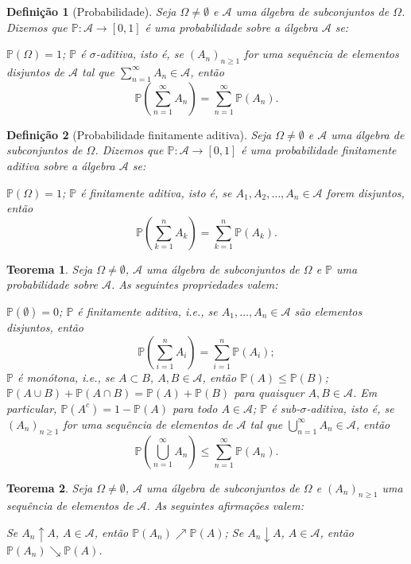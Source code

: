\documentclass[12pt,a4paper,answers]{article}
\numberwithin{equation}{section} %
\renewcommand{\P}{\mathbb{P}}
\newcommand{\Acal}{\mathcal{A}}
\theoremstyle{thm_estilo}
\newtheorem{theorem}{Teorema}[section]
\newtheorem{definition}{Definição}[section]
\theoremstyle{thm_note_est}
\begin{document}
\begin{definition}[Probabilidade]
	Seja $\Omega \neq \emptyset$ e $\Acal$ uma álgebra de subconjuntos de $\Omega$. Dizemos que $\P : \Acal \to [0,1]$ é uma probabilidade sobre a álgebra $\Acal$ se:
	\begin{outline}[enumerate]
		\1 $\P(\Omega) = 1$;
		\1 $\P$ é $\sigma$-aditiva, isto é, se $(A_n)_{n\geq 1}$ for uma sequência de elementos disjuntos de $\Acal$ tal que $\sum_{n=1}^{\infty} A_n \in \Acal$, então
		\[
		\P\left( \sum_{n=1}^{\infty} A_n \right) = \sum_{n=1}^{\infty} \P(A_n).
		\]
	\end{outline}
\end{definition}

\begin{definition}[Probabilidade finitamente aditiva]
	Seja $\Omega \neq \emptyset$ e $\Acal$ uma álgebra de subconjuntos de $\Omega$. Dizemos que $\P : \Acal \to [0,1]$ é uma probabilidade finitamente aditiva sobre a álgebra $\Acal$ se:
	\begin{outline}[enumerate]
		\1 $\P(\Omega) = 1$;
		\1 $\P$ é finitamente aditiva, isto é, se $A_1, A_2, \ldots, A_n \in \Acal$ forem disjuntos, então
		\[
		\P\left( \sum_{k=1}^{n} A_k \right) = \sum_{k=1}^{n} \P(A_k).
		\]
	\end{outline}
\end{definition}

\begin{theorem}
	Seja $\Omega \neq \emptyset$, $\Acal$ uma álgebra de subconjuntos de $\Omega$ e $\P$ uma probabilidade sobre $\Acal$. As seguintes propriedades valem:
	\begin{outline}[enumerate]
		\1 $\P(\emptyset) = 0$;
		\1 $\P$ é finitamente aditiva, i.e., se $A_1, \ldots, A_n \in \Acal$ são elementos disjuntos, então
		\[
		\P\left( \sum_{i=1}^{n} A_i \right) = \sum_{i=1}^{n} \P(A_i);
		\]
		\1 $\P$ é monótona, i.e., se $A \subset B$, $A, B \in \Acal$, então $\P(A) \leq \P(B)$;
		\1 $\P(A \cup B) + \P(A \cap B) = \P(A) + \P(B)$ para quaisquer $A, B \in \Acal$. Em particular, $\P(A^c) = 1 - \P(A)$ para todo $A \in \Acal$;
		\1 $\P$ é sub-$\sigma$-aditiva, isto é, se $(A_n)_{n\geq 1}$ for uma sequência de elementos de $\Acal$ tal que $\bigcup_{n=1}^{\infty} A_n \in \Acal$, então
		\[
		\P\left( \bigcup_{n=1}^{\infty} A_n \right) \leq \sum_{n=1}^{\infty} \P(A_n).
		\]
	\end{outline}
\end{theorem}

\begin{theorem}
	Seja $\Omega \neq \emptyset$, $\Acal$ uma álgebra de subconjuntos de $\Omega$ e $(A_n)_{n\geq 1}$ uma sequência de elementos de $\Acal$. As seguintes afirmações valem:
	\begin{outline}[enumerate]
		\1 Se $A_n \uparrow A$, $A \in \Acal$, então $\P(A_n) \nearrow \P(A)$;
		\1 Se $A_n \downarrow A$, $A \in \Acal$, então $\P(A_n) \searrow \P(A)$.
	\end{outline}
\end{theorem}
\end{document}
